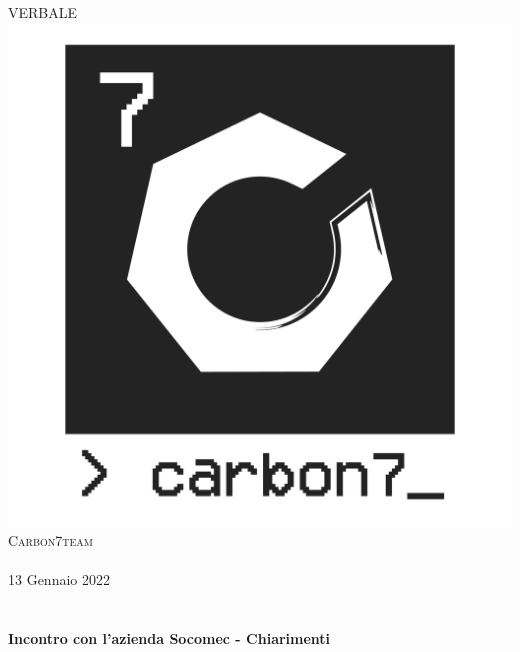 \begin{center}
    \textsc{\huge VERBALE}\\[0.75cm] 
    \includegraphics[scale=0.25]{res/images/carbon7_small_logo-07.png}\\[1cm]
    \textsc{\Large Carbon7team}\\[0.3cm]
    \\[0.5cm]
    {\large 13 Gennaio 2022}\\[0.5cm]
    \\[0.5cm]

    \HRule \\[0.4cm]
    {\huge \bfseries Incontro con l'azienda Socomec - Chiarimenti}\\[0.2cm]
    \HRule \\[1.5cm]


\end{center}

